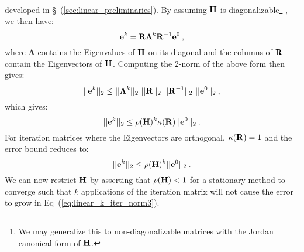 developed in \S~(\ref{sec:linear_preliminaries}). By assuming $\mathbf{H}$
is diagonalizable\footnote{We may generalize this to
  non-diagonalizable matrices with the Jordan canonical form of
  $\mathbf{H}$.} \cite{saad_iterative_2003}, we then have:
\begin{equation}
  \mathbf{e}^{k} =
  \mathbf{R}\boldsymbol{\Lambda}^k\mathbf{R}^{-1}\mathbf{e}^0\:,
  \label{eq:linear_k_iter_error_diag}
\end{equation}
where $\boldsymbol{\Lambda}$ contains the Eigenvalues of $\mathbf{H}$ on
its diagonal and the columns of $\mathbf{R}$ contain the Eigenvectors of
$\mathbf{H}$. Computing the 2-norm of the above form then gives:
\begin{equation}
  ||\ve{e}^{k}||_2 \leq ||\boldsymbol{\Lambda}^k||_2\ 
  ||\ve{R}||_2\ ||\ve{R}^{-1}||_2\ ||\ve{e}^0||_2\:,
  \label{eq:linear_k_iter_norm1}
\end{equation}
which gives:
\begin{equation}
  ||\mathbf{e}^{k}||_2 \leq \rho(\mathbf{H})^k \kappa(\mathbf{R})
  ||\mathbf{e}^0||_2\:.
  \label{eq:linear_k_iter_norm2}
\end{equation}
For iteration matrices where the Eigenvectors are orthogonal,
$\kappa(\mathbf{R})=1$ and the error bound reduces to:
\begin{equation}
  ||\mathbf{e}^{k}||_2 \leq \rho(\mathbf{H})^k
  ||\mathbf{e}^0||_2\:.
  \label{eq:linear_k_iter_norm3}
\end{equation}
We can now restrict $\mathbf{H}$ by asserting that $\rho(\mathbf{H}) < 1$
for a stationary method to converge such that $k$ applications of the
iteration matrix will not cause the error to grow in
Eq~(\ref{eq:linear_k_iter_norm3}). 

